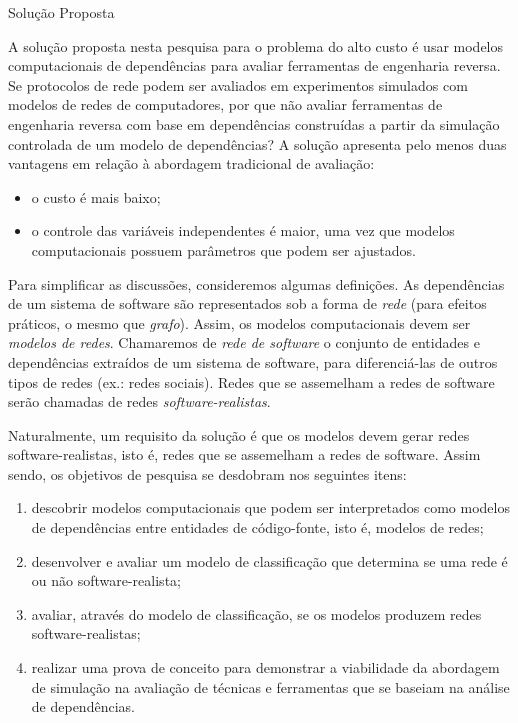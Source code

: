 \begin{section}{Solução Proposta}
	
	
	A solução proposta nesta pesquisa para o problema do alto custo é usar modelos computacionais de dependências para avaliar ferramentas de engenharia reversa. Se protocolos de rede podem ser avaliados em experimentos simulados com modelos de redes de computadores, por que não avaliar ferramentas de engenharia reversa com base em dependências construídas a partir da simulação controlada de um modelo de dependências? A solução apresenta pelo menos duas vantagens em relação à abordagem tradicional de avaliação: 
	
	\begin{itemize}
		\item o custo é mais baixo;
		\item o controle das variáveis independentes é maior, uma vez que modelos computacionais possuem parâmetros que podem ser ajustados.
	\end{itemize}
	
	Para simplificar as discussões, consideremos algumas definições. As dependências de um sistema de software são representados sob a forma de \emph{rede} (para efeitos práticos, o mesmo que \emph{grafo}). Assim, os modelos computacionais devem ser \emph{modelos de redes}. Chamaremos de \emph{rede de software} o conjunto de entidades e dependências extraídos de um sistema de software, para diferenciá-las de outros tipos de redes (ex.: redes sociais). Redes que se assemelham a redes de software serão chamadas de redes \emph{software-realistas}.
	
	Naturalmente, um requisito da solução é que os modelos devem gerar redes software-realistas, isto é, redes que se assemelham a redes de software. Assim sendo, os objetivos de pesquisa se desdobram nos seguintes itens:
	
	\begin{enumerate}
		\item descobrir modelos computacionais que podem ser interpretados como modelos de dependências entre entidades de código-fonte, isto é, modelos de redes;
		\item desenvolver e avaliar um modelo de classificação que determina se uma rede é ou não software-realista;
		\item avaliar, através do modelo de classificação, se os modelos produzem redes software-realistas;
		\item realizar uma prova de conceito para demonstrar a viabilidade da abordagem de simulação na avaliação de técnicas e ferramentas que se baseiam na análise de dependências.
	\end{enumerate}
\end{section}

